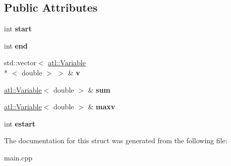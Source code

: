 \subsection*{Public Attributes}
\begin{DoxyCompactItemize}
\item 
\hypertarget{struct_divide_thread_function_aee202c990f581cd1f8e70ee9ca8f38de}{int {\bfseries start}}\label{struct_divide_thread_function_aee202c990f581cd1f8e70ee9ca8f38de}

\item 
\hypertarget{struct_divide_thread_function_a270383cbbc9f9bf241f1999a2150b8cf}{int {\bfseries end}}\label{struct_divide_thread_function_a270383cbbc9f9bf241f1999a2150b8cf}

\item 
\hypertarget{struct_divide_thread_function_acf89337a48cc33d83deeba2cabdf4d03}{std\+::vector$<$ \hyperlink{structatl_1_1_variable}{atl\+::\+Variable}\\*
$<$ double $>$ $>$ \& {\bfseries v}}\label{struct_divide_thread_function_acf89337a48cc33d83deeba2cabdf4d03}

\item 
\hypertarget{struct_divide_thread_function_a77462ce4eb69f3f787b15146cabee574}{\hyperlink{structatl_1_1_variable}{atl\+::\+Variable}$<$ double $>$ \& {\bfseries sum}}\label{struct_divide_thread_function_a77462ce4eb69f3f787b15146cabee574}

\item 
\hypertarget{struct_divide_thread_function_a151d09db2557a9ccca3c69aaea062904}{\hyperlink{structatl_1_1_variable}{atl\+::\+Variable}$<$ double $>$ \& {\bfseries maxv}}\label{struct_divide_thread_function_a151d09db2557a9ccca3c69aaea062904}

\item 
\hypertarget{struct_divide_thread_function_a8c9dc077dc572fd1c42ff39124ccde5b}{int {\bfseries estart}}\label{struct_divide_thread_function_a8c9dc077dc572fd1c42ff39124ccde5b}

\end{DoxyCompactItemize}


The documentation for this struct was generated from the following file\+:\begin{DoxyCompactItemize}
\item 
main.\+cpp\end{DoxyCompactItemize}

